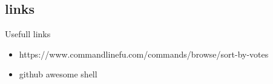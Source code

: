 \subsection{links}

\begin{frame}[fragile]{Usefull links}
\begin{itemize}
  \pause \item https://www.commandlinefu.com/commands/browse/sort-by-votes
  \pause \item github awesome shell
\end{itemize}
\end{frame}
